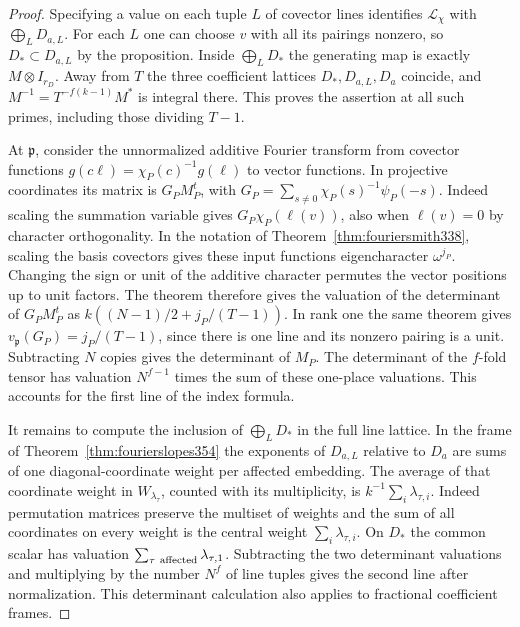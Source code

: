 \documentclass[a4paper,11pt]{article}
\theoremstyle{definition}
\theoremstyle{remark}
\numberwithin{equation}{section}
\begin{document}
\begin{proof}
Specifying a value on each tuple \(L\) of covector lines
identifies \(\mathcal L_\chi\) with \(\bigoplus_L D_{a,L}\).
For each \(L\) one can choose \(v\) with all its pairings
nonzero, so \(D_*\subset D_{a,L}\) by the proposition.
Inside \(\bigoplus_L D_*\) the generating map is exactly
\(M\otimes I_{r_D}\). Away from \(T\) the three coefficient
lattices \(D_*,D_{a,L},D_a\) coincide, and \(M^{-1}=
T^{-f(k-1)}M^*\) is integral there. This proves the assertion
at all such primes, including those dividing \(T-1\).

At \(\mathfrak p\), consider the unnormalized additive Fourier
transform from covector functions \(g(c\ell)=\chi_P(c)^{-1}g(\ell)\)
to vector functions. In projective coordinates its matrix is
\(G_P M_P^t\), with
\(G_P=\sum_{s\ne0}\chi_P(s)^{-1}\psi_P(-s)\). Indeed scaling
the summation variable gives \(G_P\chi_P(\ell(v))\), also
when \(\ell(v)=0\) by character orthogonality. In the notation
of Theorem~\ref{thm:fouriersmith338}, scaling the basis
covectors gives these input functions eigencharacter
\(\omega^{j_P}\). Changing the sign or unit of the additive
character permutes the vector positions up to unit factors.
The theorem therefore gives the valuation of the determinant
of \(G_PM_P^t\) as \(k((N-1)/2+j_P/(T-1))\).
In rank one the same theorem gives
\(v_\mathfrak p(G_P)=j_P/(T-1)\), since there is one line
and its nonzero pairing is a unit. Subtracting \(N\) copies
gives the determinant of \(M_P\). The determinant of the
\(f\)-fold tensor has valuation \(N^{f-1}\) times the sum
of these one-place valuations. This accounts for the first
line of the index formula.

It remains to compute the inclusion of \(\bigoplus_L D_*\)
in the full line lattice. In the frame of
Theorem~\ref{thm:fourierslopes354} the exponents of
\(D_{a,L}\) relative to \(D_a\) are sums of one diagonal-coordinate
weight per affected embedding. The average of that coordinate
weight in \(W_{\lambda_\tau}\), counted with its multiplicity,
is \(k^{-1}\sum_i\lambda_{\tau,i}\). Indeed permutation
matrices preserve the multiset of weights and the sum of all
coordinates on every weight is the central weight
\(\sum_i\lambda_{\tau,i}\). On \(D_*\) the common scalar
has valuation \(\sum_{\tau\ {\rm affected}}\lambda_{\tau,1}\).
Subtracting the two determinant valuations and multiplying
by the number \(N^f\) of line tuples gives the second line
after normalization. This determinant calculation also applies
to fractional coefficient frames.
\end{proof}
\end{document}
